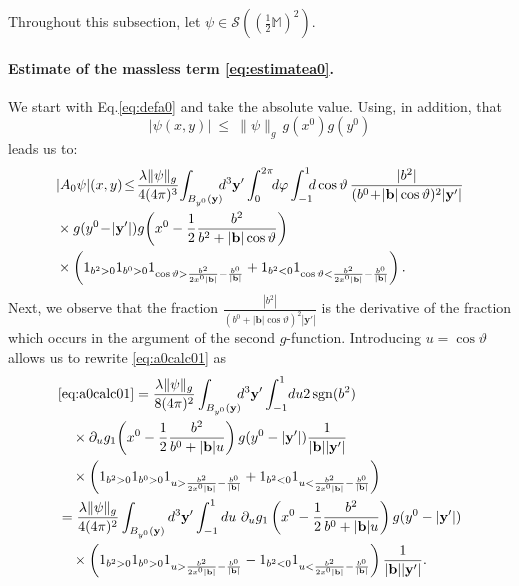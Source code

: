 \documentclass[b5paper,draft,openbib,12pt]{memoir}
\newcommand{\M}{\mathbb{M}}
\newcommand{\vy}{\mathbf{y}}
\newcommand{\vb}{\mathbf{b}}
\DeclareMathOperator{\sgn}{sgn}
\begin{document}
Throughout this subsection, let $\psi \in 
\mathcal{S}((\tfrac{1}{2}\M)^2)$.

\paragraph{Estimate of the massless term 
\eqref{eq:estimatea0}.} \label{sec:estimatemassless}

We start with Eq.\@ \eqref{eq:defa0} and take the 
absolute value. Using, in addition, that
\begin{equation}
	|\psi(x,y)| ~\leq~ \| \psi \|_g \, g(x^0) g(y^0)
\end{equation}
leads us to:
\begin{align}
    &|A_0\psi|(x,y) \!\le\! \frac{\lambda \|\psi\|_g}{4(4\pi)^3} \!\int_{B_{y^0}(\vy)}\!\!\!d^3 \vy' \int_0^{2\pi} \!\!d\varphi \int_{-1}^1 \!\!\!d\cos\vartheta \, \frac{|b^2|}{(b^0\!+\!|\vb|\cos\vartheta)^2 |\vy'|} \nonumber\\
    &\times g(y^0\!-\!|\vy'|) g\!\left(x^0-\frac{1}{2}\frac{b^2}{b^2+|\vb|\cos\vartheta}\right)\notag\\
    &\times \left(1_{b^2>0}1_{b^0>0} 1_{\cos\vartheta > \frac{b^2}{2x^0|\vb|} - \frac{b^0}{|\vb|}}+1_{b^2<0}1_{\cos\vartheta<\frac{b^2}{2x^0|\vb|} - \frac{b^0}{|\vb|}}\right).
\label{eq:a0calc01}
\end{align}
Next, we observe that the fraction 
$\frac{|b^2|}{(b^0+|\vb|\cos\vartheta)^2 |\vy'|}$ is 
the derivative of the fraction which occurs in the 
argument of the second $g$-function. Introducing 
$u = \cos \vartheta$ allows us to rewrite 
\eqref{eq:a0calc01} as
\begin{align}
     &\eqref{eq:a0calc01} =\frac{\lambda \|\psi\|_g}{8(4\pi)^2} \int_{B_{y^0}(\vy)}\!\!\!d^3\vy' \int_{-1}^1\!du  2 \sgn(b^2)\,  \notag\\
    &\quad \times \partial_u g_1\!\left(x^0-\frac{1}{2}\frac{b^2}{b^0+|\vb|u}\right) g(y^0-|\vy'|) \frac{1}{|\vb||\vy'|}\\\nonumber
    &\quad \times \left(1_{b^2>0}1_{b^0>0} 1_{u > \frac{b^2}{2x^0|\vb|} - \frac{b^0}{|\vb|}}+1_{b^2<0}1_{u<\frac{b^2}{2x^0|\vb|} - \frac{b^0}{|\vb|}}\right) \\
    &=\frac{\lambda \|\psi\|_g}{4(4\pi)^2} \int_{B_{y^0}(\vy)}d^3\vy' \int_{-1}^1 du  ~ \partial_u g_1\left(x^0-\frac{1}{2}\frac{b^2}{b^0+|\vb|u}\right) g(y^0-|\vy'|)\nonumber\\
    &\quad \times   \left(1_{b^2>0}1_{b^0>0} 1_{u > \frac{b^2}{2x^0|\vb|} - \frac{b^0}{|\vb|}}-1_{b^2<0}1_{u<\frac{b^2}{2x^0|\vb|} - \frac{b^0}{|\vb|}}\right) \frac{1}{|\vb||\vy'|}.
\label{eq:a0calc02}
\end{align}
\end{document}
